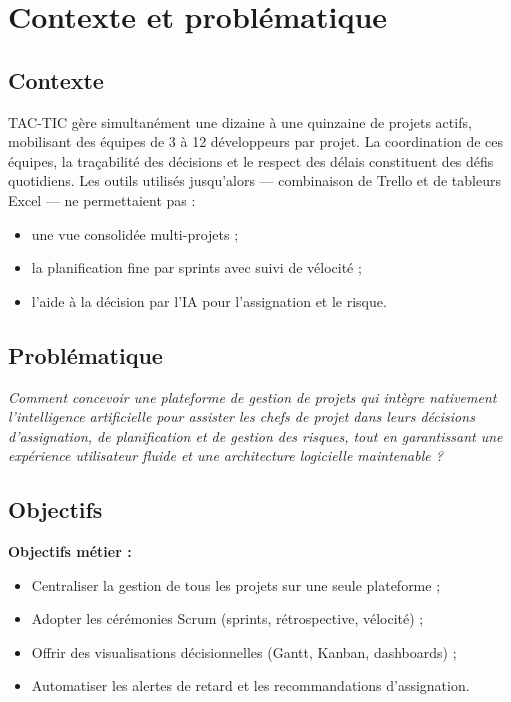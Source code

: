 \section{Contexte et problématique}

\subsection{Contexte}

TAC-TIC gère simultanément une dizaine à une quinzaine de projets actifs, mobilisant
des équipes de 3 à 12 développeurs par projet. La coordination de ces équipes, la
traçabilité des décisions et le respect des délais constituent des défis quotidiens.
Les outils utilisés jusqu'alors — combinaison de Trello et de tableurs Excel — ne
permettaient pas :
\begin{itemize}
  \item une vue consolidée multi-projets ;
  \item la planification fine par sprints avec suivi de vélocité ;
  \item l'aide à la décision par l'IA pour l'assignation et le risque.
\end{itemize}

\subsection{Problématique}

\begin{mdframed}[linecolor=primary,linewidth=1.5pt,frametitle={}]
\centering
\textit{Comment concevoir une plateforme de gestion de projets qui intègre nativement
l'intelligence artificielle pour assister les chefs de projet dans leurs décisions
d'assignation, de planification et de gestion des risques, tout en garantissant une
expérience utilisateur fluide et une architecture logicielle maintenable ?}
\end{mdframed}

\subsection{Objectifs}

\textbf{Objectifs métier :}
\begin{itemize}
  \item Centraliser la gestion de tous les projets sur une seule plateforme ;
  \item Adopter les cérémonies Scrum (sprints, rétrospective, vélocité) ;
  \item Offrir des visualisations décisionnelles (Gantt, Kanban, dashboards) ;
  \item Automatiser les alertes de retard et les recommandations d'assignation.
\end{itemize}

